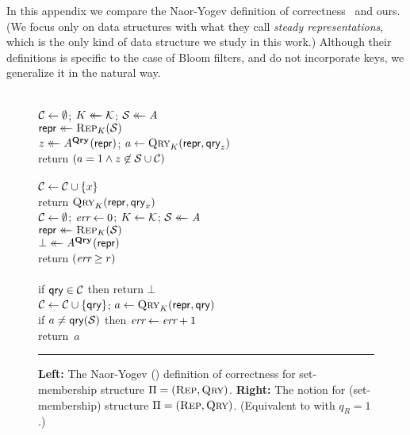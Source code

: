\label{sec:compare-defs}
\label{sec:errepone}
\newcommand{\ny}{\notionfont{NY}}

In this appendix we compare the Naor-Yogev definition of
correctness~\cite{naor2015bloom} and ours. (We focus only on data structures
with what they call \emph{steady representations}, which is the only kind of
data structure we study in this work.)
%
Although their definitions is specific to the case of Bloom filters, and do not
incorporate keys, we generalize it in the natural way.
\begin{figure}[t]
  {
    \experimentv{$\Exp{\ny}_{\struct}(\advA)$}\\[2pt]
      $\mathcal{C} \gets \emptyset$;
      $K \mathrel{\leftarrow\mkern-14mu\leftarrow} \mathcal{K}$;
      $\mathcal{S} \mathrel{\leftarrow\mkern-14mu\leftarrow} \mathit{A}$\\
      $\mathsf{repr} \mathrel{\leftarrow\mkern-14mu\leftarrow} \textsc{Rep}_K(\mathcal{S})$\\
      $z \mathrel{\leftarrow\mkern-14mu\leftarrow} A^{\mathbf{Qry}\hspace{0.5pt}}(\mathsf{repr})$;
      $a \gets \textsc{Qry}_K(\mathsf{repr},\mathsf{qry}_z)$\\
      return $\left( a = 1 \wedge z \not\in \mathcal{S} \cup \mathcal{C} \right)$
  \\[6pt]
    \\[2pt]
      $\mathcal{C} \gets \mathcal{C} \cup \{x\}$\\
      return $\textsc{Qry}_K(\mathsf{repr}, \mathsf{qry}_x)$
  }
  {
    \\[2pt]
      $\mathcal{C} \gets \emptyset$;
      $\textit{err} \gets 0$;
      $K \gets \mathcal{K}$;
      $\mathcal{S} \mathrel{\leftarrow\mkern-14mu\leftarrow} \mathit{A}$\\
      $\mathsf{repr} \mathrel{\leftarrow\mkern-14mu\leftarrow} \textsc{Rep}_K(\mathcal{S})$\\
      $\bot \mathrel{\leftarrow\mkern-14mu\leftarrow} \mathit{A}^{\mathbf{Qry}\hspace{0.5pt}}(\mathsf{repr})$\\
      return $(\textit{err} \ge r)$
    \\[6pt]
    \oraclev{$\QRYO(\qry)$}\\[2pt]
      if $\mathsf{qry} \in \mathcal{C}$ then return $\bot$\\
      $\mathcal{C} \gets \mathcal{C} \cup \{\mathsf{qry}\}$;
      $a \gets \textsc{Qry}_K(\mathsf{repr},\mathsf{qry})$\\
      if $a \neq \mathsf{qry}(\mathcal{S})$ then $\textit{err}\gets\textit{err}+1$\\
      return~$a$
  }
  \caption{\textbf{Left:} The Naor-Yogev (\ny) definition of correctness for set-membership structure
  $\mathrm{\Pi} = (\textsc{Rep}, \textsc{Qry})$.
  \textbf{Right:} The \errepone notion for (set-membership) structure $\mathrm{\Pi} =
  (\textsc{Rep}, \textsc{Qry})$. (Equivalent to \errep with $q_R=1$.)}
  \label{fig:ny-correct}
  \vspace{6pt}\hrule
\end{figure}
